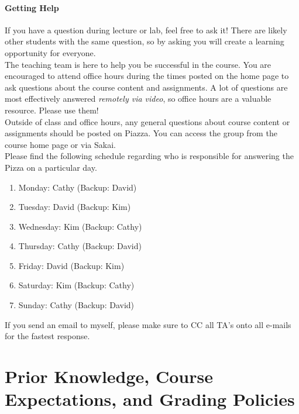 \documentclass[11pt]{article}
\begin{document}
\paragraph{Getting Help}

If you have a question during lecture or lab, feel free to ask it! There are likely other students with the same question, so by asking you will create a learning opportunity for everyone. \\ 

The teaching team is here to help you be successful in the course. You are encouraged to attend office hours during the times posted on the home page to ask questions about the course content and assignments. A lot of questions are most effectively answered \emph{remotely via video}, so office hours are a valuable resource. Please use them! \\ 

Outside of class and office hours, any general questions about course content or assignments should be posted on Piazza. You can access the group from the course home page or via Sakai.  \\

Please find the following schedule regarding who is responsible for answering the Pizza on a particular day.

\begin{enumerate}
\item Monday: Cathy (Backup: David)
\item Tuesday: David (Backup: Kim)
\item Wednesday: Kim (Backup: Cathy)
\item Thursday: Cathy (Backup: David)
\item Friday: David (Backup: Kim)
\item Saturday: Kim (Backup: Cathy)
\item Sunday: Cathy (Backup: David)
\end{enumerate}

If you send an email to myself, please make sure to CC all TA's onto all e-mails for the fastest response.\\



\section{Prior Knowledge, Course Expectations, and Grading Policies}
\end{document}
